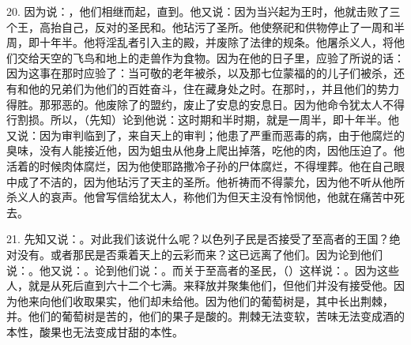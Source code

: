 20. 因为说：，他们相继而起，直到。他又说：因为当兴起为王时，他就击败了三个王，高抬自己，反对的圣民和。他玷污了圣所。他使祭祀和供物停止了一周和半周，即十年半。他将淫乱者引入主的殿，并废除了法律的规条。他屠杀义人，将他们交给天空的飞鸟和地上的走兽作为食物。因为在他的日子里，应验了所说的话：因为这事在那时应验了：当可敬的老年被杀，以及那七位蒙福的的儿子们被杀，还有和他的兄弟们为他们的百姓奋斗，住在藏身处之时。在那时，，并且他们的势力得胜。那邪恶的。他废除了的盟约，废止了安息的安息日。因为他命令犹太人不得行割损。所以，（先知）论到他说：这时期和半时期，就是一周半，即十年半。他又说：因为审判临到了，来自天上的审判；他患了严重而恶毒的病，由于他腐烂的臭味，没有人能接近他，因为蛆虫从他身上爬出掉落，吃他的肉，因他压迫了。他活着的时候肉体腐烂，因为他使耶路撒冷子孙的尸体腐烂，不得埋葬。他在自己眼中成了不洁的，因为他玷污了天主的圣所。他祈祷而不得蒙允，因为他不听从他所杀义人的哀声。他曾写信给犹太人，称他们为但天主没有怜悯他，他就在痛苦中死去。\par

21. 先知又说：。对此我们该说什么呢？以色列子民是否接受了至高者的王国？绝对没有。或者那民是否乘着天上的云彩而来？这已远离了他们。因为论到他们说：。他又说：。论到他们说：。而关于至高者的圣民，（）这样说：。因为这些人，就是从死后直到六十二个七满。来释放并聚集他们，但他们并没有接受他。因为他来向他们收取果实，他们却未给他。因为他们的葡萄树是，其中长出荆棘，并。他们的葡萄树是苦的，他们的果子是酸的。荆棘无法变软，苦味无法变成酒的本性，酸果也无法变成甘甜的本性。\par

